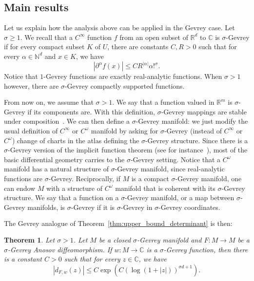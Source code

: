 \documentclass[10pt]{amsart}
\newtheorem{theo}{Theorem}[section]
\theoremstyle{definition}\newtheorem{defi}[theo]{Definition}\newtheorem{rema}[theo]{Remark}\newtheorem{exam}[theo]{Example}\newtheorem{exem}[theo]{Example}\newtheorem{nota}[theo]{Notation}
\newcommand{\p}[1]{\left(#1\right)}
\newcommand{\va}[1]{\left|#1\right|}
\newcommand{\bbC}{\mathbb{C}}
\newcommand{\bbN}{\mathbb{N}}
\newcommand{\bbR}{\mathbb{R}}
\begin{document}
\subsection{Main results}

Let us explain how the analysis above can be applied in the Gevrey case. Let $\sigma \geq 1$. We recall that a $C^\infty$ function $f$ from an open subset of $\bbR^d$ to $\bbC$ is $\sigma$-Gevrey if for every compact subset $K$ of $U$, there are constants $C,R > 0$ such that for every $\alpha \in \bbN^d$ and $x \in K$, we have
\begin{equation*}
\va{\partial^\alpha f(x)} \leq C R^{\va{\alpha}} \alpha!^\sigma.
\end{equation*}
Notice that $1$-Gevrey functions are exactly real-analytic functions. When $\sigma > 1$ however, there are $\sigma$-Gevrey compactly supported functions.

From now on, we assume that $\sigma > 1$. We say that a function valued in $\bbR^m$ is $\sigma$-Gevrey if its components are. With this definition, $\sigma$-Gevrey mappings are stable under composition~\cite{GevreyOG}. We can then define a $\sigma$-Gevrey manifold: we just modify the usual definition of $C^\infty$ or $C^\omega$ manifold by asking for $\sigma$-Gevrey (instead of $C^\infty$ or $C^\omega$) change of charts in the atlas defining the $\sigma$-Gevrey structure. Since there is a $\sigma$-Gevrey version of the implicit function theorem (see for instance~\cite{komatsu_implicit}), most of the basic differential geometry carries to the $\sigma$-Gevrey setting. Notice that a $C^\omega$ manifold has a natural structure of $\sigma$-Gevrey manifold, since real-analytic functions are $\sigma$-Gevrey. Reciprocally, if $M$ is a compact $\sigma$-Gevrey manifold, one can endow $M$ with a structure of $C^\omega$ manifold that is coherent with its $\sigma$-Gevrey structure. We say that a function on a $\sigma$-Gevrey manifold, or a map between $\sigma$-Gevrey manifolds, is $\sigma$-Gevrey if it is $\sigma$-Gevrey in $\sigma$-Gevrey coordinates.

The Gevrey analogue of Theorem~\ref{thm:upper_bound_determinant} is then:

\begin{theo}\label{theorem:gevrey_determinant}
Let $\sigma > 1$. Let $M$ be a closed $\sigma$-Gevrey manifold and $F : M \to M$ be a $\sigma$-Gevrey Anosov diffeomorphism. If $w :M \to \bbC$ is a $\sigma$-Gevrey function, then there is a constant $C > 0$ such that for every $z \in \bbC$, we have
\begin{equation*}
\va{d_{F,w}(z)} \leq C\exp\p{C\p{\log(1 + \va{z})}^{\sigma d+1}}.
\end{equation*}
\end{theo}
\end{document}
